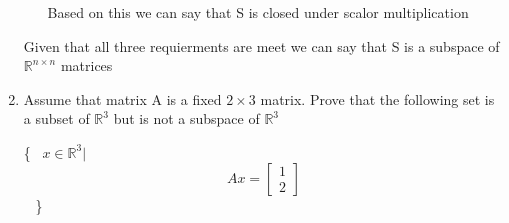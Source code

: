 \documentclass{article}
\begin{document}
\begin{enumerate}
\begin{enumerate}
\begin{center}
        \end{center}
        Based on this we can say that S is closed under scalor multiplication
    \end{enumerate}
    \par
    Given that all three requierments are meet we can say that S is a subspace of $\mathbb{R}^{n \times n}$ matrices
  \item Assume that matrix A is a fixed $2 \times 3$ matrix. Prove that the following set is a subset of $\mathbb{R}^3$ but is not a subspace of $\mathbb{R}^3$
    \begin{center}
      \left
      \{
        \mbox
        {
          $x \in \mathbb{R}^3|$
          \[
            Ax = 
            \begin{bmatrix}
              1 \\
              2 
            \end{bmatrix}
          \]
        }
        \right
      \}
    \end{center}
    \vspace{0.5cm}


\end{enumerate}
\end{document}
